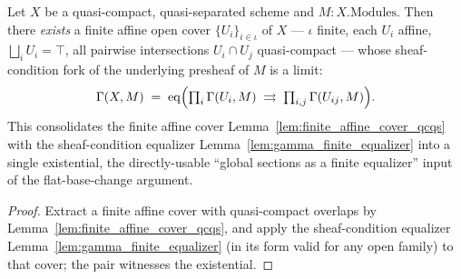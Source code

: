 \begin{lemma}
  \label{lem:gamma_finite_equalizer_cover}
  Let \(X\) be a quasi-compact, quasi-separated scheme and \(M : X.\mathrm{Modules}\). Then there
  \emph{exists} a finite affine open cover \(\{U_i\}_{i \in \iota}\) of \(X\) — \(\iota\) finite, each
  \(U_i\) affine, \(\bigsqcup_i U_i = \top\), all pairwise intersections \(U_i \cap U_j\)
  quasi-compact — whose sheaf-condition fork of the underlying presheaf of \(M\) is a limit:
  \[
    \Gamma(X, M) \;=\; \operatorname{eq}\Bigl(
      \textstyle\prod_i \Gamma(U_i, M) \;\rightrightarrows\; \prod_{i,j} \Gamma(U_{ij}, M)
    \Bigr).
  \]
  This consolidates the finite affine cover Lemma~\ref{lem:finite_affine_cover_qcqs} with the
  sheaf-condition equalizer Lemma~\ref{lem:gamma_finite_equalizer} into a single existential, the
  directly-usable ``global sections as a finite equalizer'' input of the flat-base-change argument.
  \begin{proof}
    Extract a finite affine cover with quasi-compact overlaps by
    Lemma~\ref{lem:finite_affine_cover_qcqs}, and apply the sheaf-condition equalizer
    Lemma~\ref{lem:gamma_finite_equalizer} (in its form valid for any open family) to that cover; the
    pair witnesses the existential.
  \end{proof}
\end{lemma}


